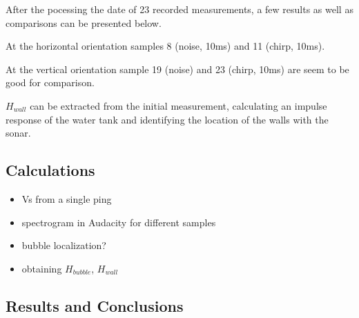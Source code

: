 After the pocessing the date of 23 recorded measurements, a few results as well as comparisons can be presented below. 

At the horizontal orientation samples 8 (noise, 10ms) and 11 (chirp, 10ms).

At the vertical orientation sample 19 (noise) and 23 (chirp, 10ms) are seem to be good for comparison.

\textbf{$H_{wall}$} can be extracted from the initial measurement, calculating an impulse response of the water tank and identifying the location of the walls with the sonar.



\subsection{Calculations}

\begin{itemize}
    \item Vs from a single ping
    \item spectrogram in Audacity for different samples
    \item bubble localization?
    \item obtaining $H_{bubble}$, $H_{wall}$
\end{itemize}


\subsection{Results and Conclusions}



